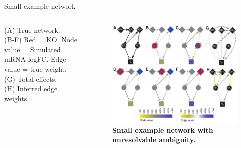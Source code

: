 \begin{frame}{Small example network}
\begin{columns}
\begin{column}{0.4\linewidth}

(A) True network.\\
(B-F) Red = KO. Node value = Simulated mRNA logFC. Edge value = true weight.\\
(G) Total effects.\\
(H) Inferred edge weights.\\


\end{column}
\begin{column}{0.6\linewidth}
\begin{figure}[ht]
\centering
\includegraphics[width=\linewidth]{theory/fig/Fig2.pdf}
\caption{\textbf{Small example network with unresolvable ambiguity.}}
\label{fig:small}
\end{figure}
\end{column}
\end{columns}
\end{frame}


